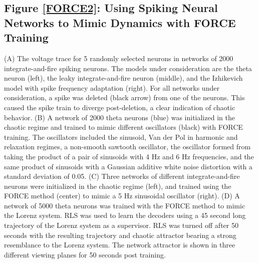 \documentclass[11pt]{article} %
\begin{document}
\subsection*{Figure \ref{FORCE2}: Using Spiking Neural Networks to Mimic Dynamics with FORCE Training }
(A) The voltage trace for 5 randomly selected neurons in networks of 2000 integrate-and-fire spiking neurons.      The models under consideration are the theta neuron (left), the leaky integrate-and-fire neuron (middle), and the Izhikevich model with spike frequency adaptation (right).    For all networks under consideration, a spike was deleted (black arrow) from one of the neurons.  This caused the spike train to diverge post-deletion, a clear indication of chaotic behavior.  (B) A network of 2000 theta neurons (blue) was initialized in the chaotic regime and trained to mimic different oscillators (black) with FORCE training.    The oscillators included the sinusoid, Van der Pol in harmonic and relaxation regimes, a non-smooth sawtooth oscillator, the oscillator formed from  taking the product of a pair of sinusoids with 4 Hz and 6 Hz frequencies, and the same product of sinusoids with a Gaussian additive white noise distortion with a standard deviation of 0.05.  (C) Three networks of different integrate-and-fire neurons were initialized in the chaotic regime (left), and trained using the FORCE method (center) to mimic a 5 Hz sinusoidal oscillator (right).   (D) A network of 5000 theta neurons was trained with the FORCE method to mimic the Lorenz system.  RLS was used to learn the decoders using a 45 second long trajectory of the Lorenz system as a supervisor.  RLS was turned off after 50 seconds with the resulting trajectory and chaotic attractor bearing a strong resemblance to the Lorenz system.  The network attractor is shown in three different viewing planes for 50 seconds post training.  
\end{document}
